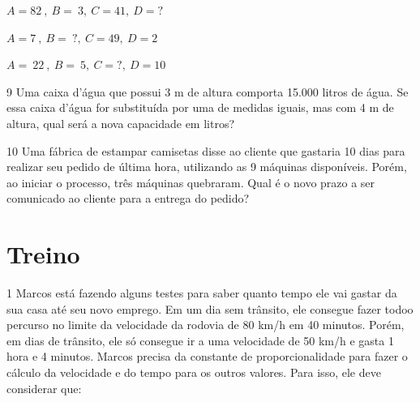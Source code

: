 \begin{escolha}[itemsep=0pt]
\item $A = 82\ ,\ B = \ 3,\ C = 41,\ D = ?$ 
\item $A = 7\ ,\ B = \ ?,\ C = 49,\ D = 2$
\item $A = \ 22\ ,\ B = \ 5,\ C = ?,\ D = 10$
\end{escolha}

\num{9} Uma caixa d'água que possui 3 m de altura comporta 15.000 litros de
água. Se essa caixa d'água for substituída por uma de medidas iguais,
mas com 4 m de altura, qual será a nova capacidade em litros?


\num{10} Uma fábrica de estampar camisetas disse ao cliente que gastaria 10
dias para realizar seu pedido de última hora, utilizando as 9 máquinas
disponíveis. Porém, ao iniciar o processo, três máquinas quebraram. Qual
é o novo prazo a ser comunicado ao cliente para a entrega do pedido?


\section*{Treino}

\num{1} Marcos está fazendo alguns testes para saber quanto tempo ele vai
gastar da sua casa até seu novo emprego. Em um dia sem trânsito, ele
consegue fazer todoo percurso no limite da velocidade da rodovia de 80
km/h em 40 minutos. Porém, em dias de trânsito, ele só consegue ir a uma
velocidade de 50 km/h e gasta 1 hora e 4 minutos. Marcos precisa da
constante de proporcionalidade para fazer o cálculo da velocidade e do
tempo para os outros valores. Para isso, ele deve considerar que:

